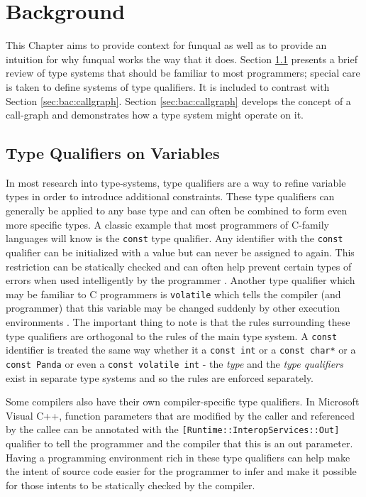 \chapter{Background}\label{sec:background}

This Chapter aims to provide context for funqual as well as to provide an intuition for why funqual works the way that it does.  Section \ref{sec:bac:varqual} presents a brief review of type systems that should be familiar to most programmers; special care is taken to define systems of type qualifiers.  It is included to contrast with Section \ref{sec:bac:callgraph}.  Section \ref{sec:bac:callgraph} develops the concept of a call-graph and demonstrates how a type system might operate on it.  

\section{Type Qualifiers on Variables}\label{sec:bac:varqual}

In most research into type-systems, type qualifiers are a way to refine variable types in order to introduce additional constraints.  These type qualifiers can generally be applied to any base type and can often be combined to form even more specific types.  A classic example that most programmers of C-family languages will know is the \lstinline{const} type qualifier.  Any identifier with the \lstinline{const} qualifier can be initialized with a value but can never be assigned to again.  This restriction can be statically checked and can often help prevent certain types of errors when used intelligently by the programmer \cite{theory-of-qual}.  Another type qualifier which may be familiar to C programmers is \lstinline{volatile} which tells the compiler (and programmer) that this variable may be changed suddenly by other execution environments \cite{theory-of-qual}.  The important thing to note is that the rules surrounding these type qualifiers are orthogonal to the rules of the main type system.  A \lstinline{const} identifier is treated the same way whether it a \lstinline{const int} or a \lstinline{const char*} or a \lstinline{const Panda} or even a \lstinline{const volatile int} - the \textit{type} and the \textit{type qualifiers} exist in separate type systems and so the rules are enforced separately.  

Some compilers also have their own compiler-specific type qualifiers.  In Microsoft Visual C++, function parameters that are modified by the caller and referenced by the callee can be annotated with the \lstinline{[Runtime::InteropServices::Out]} qualifier to tell the programmer and the compiler that this is an out parameter.  Having a programming environment rich in these type qualifiers can help make the intent of source code easier for the programmer to infer and make it possible for those intents to be statically checked by the compiler.  

